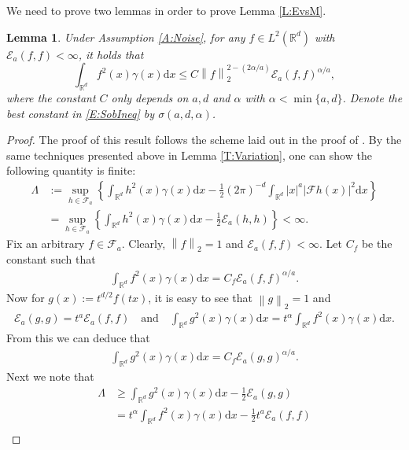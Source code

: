 \documentclass[12pt]{report}
\theoremstyle{plain}
\newtheorem{lemma}[theorem]{Lemma}
\theoremstyle{definition}
\numberwithin{equation}{section}
\newcommand{\R}{\mathbb{R}}
\newcommand{\Norm}[1]{\left\|  #1   \right\|}
\newcommand{\ud}{\ensuremath{ \mathrm{d} }}
\begin{document}
We need to prove two lemmas in order to prove Lemma \ref{L:EvsM}.

\begin{lemma} \label{L:gammaf2bdd}
	Under Assumption \ref{A:Noise}, for any $f \in L^2(\R^d)$ with $\mathcal{E}_a(f,f) < \infty$, it
	holds that
	\begin{equation} \label{E:SobIneq}
	\int_{\R^d} f^2(x)\gamma(x) \ud x \le C \Norm{f}_2^{2-(2\alpha/a)} \mathcal{E}_a(f,f)^{\alpha/a},
	\end{equation}
	where the constant $C$ only depends on $a, d$ and $\alpha$ with $\alpha < \min\{a,d\}$. Denote the
	best constant in \eqref{E:SobIneq} by $\sigma(a,d,\alpha)$.
\end{lemma}
\begin{proof}
	The proof of this result follows the scheme laid out in the proof of \cite[Lemma A.3]{chen:12:quenched}.
	By the same techniques presented above in Lemma \ref{T:Variation}, one can show the following
	quantity is finite:
	\begin{align*}
	\Lambda & := \sup_{h\in\mathcal{F}_a}  \left\{  \int_{\R^d} h^2(x)\gamma(x) \ud x - \frac{1}{2} (2\pi)^{-d}\int_{\R^d} |x|^a|\mathcal{F} h(x)|^2 \ud x  \right\} \\
	& =    \sup_{h\in\mathcal{F}_a}  \left\{  \int_{\R^d} h^2(x)\gamma(x) \ud x - \frac{1}{2} \mathcal{E}_a(h,h)\right\} < \infty.
	\end{align*}
	Fix an arbitrary $f \in \mathcal{F}_a$. Clearly, $\Norm{f}_2 = 1$ and $\mathcal{E}_a(f,f) <
	\infty$. Let $C_f$ be the constant such that
	\begin{align*}
	\int_{\R^d} f^2(x)\gamma(x)\ud x = C_f  \mathcal{E}_a(f,f)^{\alpha / a}.
	\end{align*}
	Now for $g(x):= t^{d/2} f(tx)$, it is easy to see that $\Norm{g}_2 = 1$ and
	\begin{align*}
	\mathcal{E}_a(g,g)                = t^a\mathcal{E}_a(f,f) \quad \text{and} \quad
	\int_{\R^d} g^2(x)\gamma(x) \ud x = t^\alpha \int_{\R^d} f^2(x)\gamma(x)\ud x.
	\end{align*}
	From this we can deduce that
	\begin{align*}
	\int_{\R^d} g^2(x)\gamma(x)\ud x = C_f \mathcal{E}_a(g,g)^{\alpha/a}.
	\end{align*}
	Next we note that
	\begin{align*}
	\Lambda & \ge \int_{\R^d} g^2(x)\gamma(x)\ud x - \frac{1}{2}\mathcal{E}_a(g,g)               \\
	& = t^\alpha \int_{\R^d} f^2(x)\gamma(x) \ud x - \frac{1}{2}t^a \mathcal{E}_a(f,f)   \\

\end{align*}
\end{proof}
\end{document}
